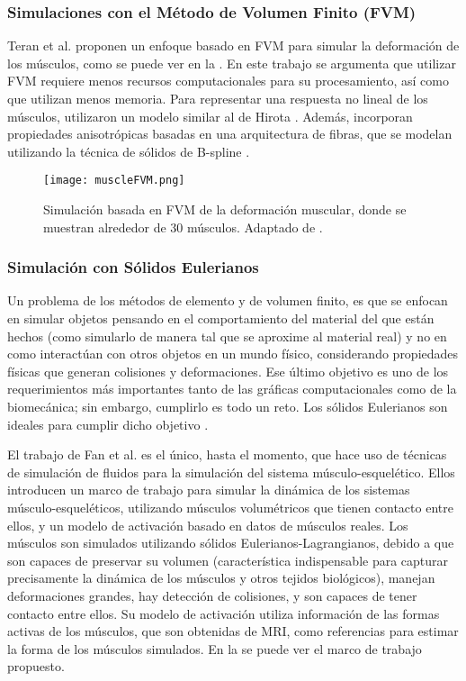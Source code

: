 \subsubsection{Simulaciones con el Método de Volumen Finito (FVM)}

Teran et al. \citep{teran2003finite, teran2005creating} proponen un enfoque basado en FVM para simular la deformación de los músculos, como se puede ver en la . En este trabajo se argumenta que utilizar FVM requiere menos recursos computacionales para su procesamiento, así como que utilizan menos memoria. Para representar una respuesta no lineal de los músculos, utilizaron un modelo similar al de Hirota \citep{hirota2001implicit}. Además, incorporan propiedades anisotrópicas basadas en una arquitectura de fibras, que se modelan utilizando la técnica de sólidos de B-spline \citep{ng2001anatomically}.

\begin{figure}
	\centering
		\texttt{[image: muscleFVM.png]}
	\caption[Simulación basada en FVM de la deformación muscular.]{Simulación basada en FVM de la deformación muscular, donde se muestran alrededor de 30 músculos. Adaptado de \citep{teran2005creating}.}
		\label{fig:muscleFVM}
\end{figure}

\subsubsection{Simulación con Sólidos Eulerianos}

Un problema de los métodos de elemento y de volumen finito, es que se enfocan en simular objetos pensando en el comportamiento del material del que están hechos (como simularlo de manera tal que se aproxime al material real) y no en como interactúan con otros objetos en un mundo físico, considerando propiedades físicas que generan colisiones y deformaciones. Ese último objetivo es uno de los requerimientos más importantes tanto de las gráficas computacionales como de la biomecánica; sin embargo, cumplirlo es todo un reto. Los sólidos Eulerianos son ideales para cumplir dicho objetivo \citep{pai2014eulerian}. 

El trabajo de Fan et al. \citep{fan2014active} es el único, hasta el momento, que hace uso de técnicas de simulación de fluidos para la simulación del sistema músculo-esquelético. Ellos introducen un marco de trabajo para simular la dinámica de los sistemas músculo-esqueléticos, utilizando músculos volumétricos que tienen contacto entre ellos, y un modelo de activación basado en datos de músculos reales. Los músculos son simulados utilizando sólidos Eulerianos-Lagrangianos, debido a que son capaces de preservar su volumen (característica indispensable para capturar precisamente la dinámica de los músculos y otros tejidos biológicos), manejan deformaciones grandes, hay detección de colisiones, y son capaces de tener contacto entre ellos. Su modelo de activación utiliza información de las formas activas de los músculos, que son obtenidas de MRI, como referencias para estimar la forma de los músculos simulados. En la  se puede ver el marco de trabajo propuesto.

